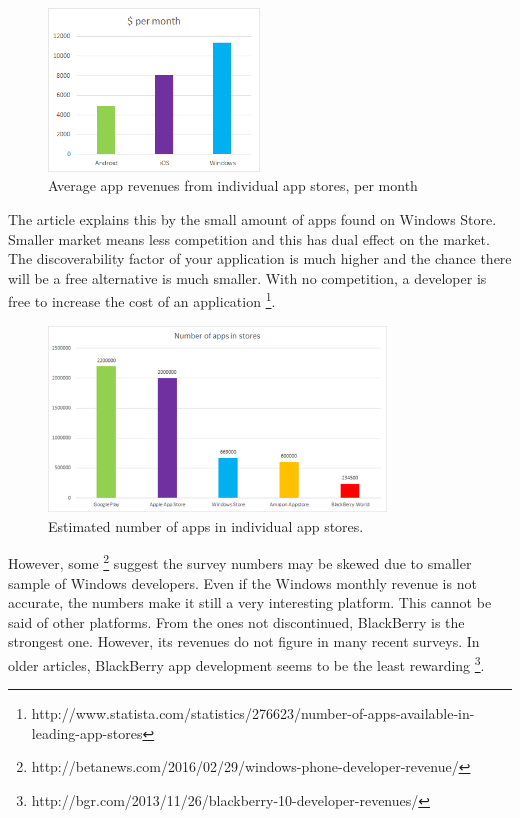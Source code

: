 \documentclass[english,master,public,dept460,male,cpdeclaration,oneside]{diploma}
\begin{document}
\begin{figure}
	\centering\includegraphics[width=0.5\textwidth]{Figures/appRevenues.png}
	\caption{Average app revenues from individual app stores, per month}
\end{figure}

The article explains this by the small amount of apps found on Windows Store. Smaller market means less competition and this has dual effect on the market. The discoverability factor of your application is much higher and the chance there will be a free alternative is much smaller. With no competition, a developer is free to increase the cost of an application \footnote{http://www.statista.com/statistics/276623/number-of-apps-available-in-leading-app-stores}.

\begin{figure}
	\centering\includegraphics[width=0.8\textwidth]{Figures/appsInStores.png}
	\caption{Estimated number of apps in individual app stores.}
\end{figure}

However, some \footnote{http://betanews.com/2016/02/29/windows-phone-developer-revenue/} suggest the survey numbers may be skewed due to smaller sample of Windows developers. Even if the Windows monthly revenue is not accurate, the numbers make it still a very interesting platform. This cannot be said of other platforms. From the ones not discontinued, BlackBerry is the strongest one. However, its revenues do not figure in many recent surveys. In older articles, BlackBerry app development seems to be the least rewarding \footnote{http://bgr.com/2013/11/26/blackberry-10-developer-revenues/}. 
\end{document}
